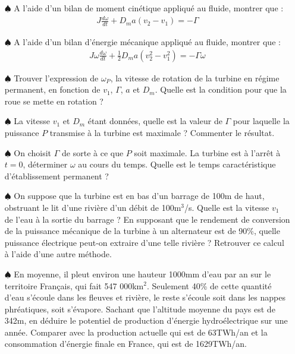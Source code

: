\documentclass{report}
\begin{document}
\begin{itemize}

	\item[$\spadesuit$] A l'aide d'un bilan de moment cinétique appliqué au fluide, montrer que :
	\begin{align*}
		 J\frac{d\omega}{dt}+D_ma(v_2-v_1)=-\Gamma
	\end{align*}

	\item[$\spadesuit$] A l'aide d'un bilan d'énergie mécanique appliqué au fluide, montrer que :	
	\begin{align*}
		J\omega\frac{d\omega}{dt}+\frac{1}{2} D_ma(v_2^2-v_1^2)=-\Gamma\omega
	\end{align*}
	
	\item[$\spadesuit$] Trouver l'expression de $\omega_P$, la vitesse de rotation de la turbine en régime permanent, en fonction de $v_1$, $\Gamma$, $a$ et $D_m$. Quelle est la condition pour que la roue se mette en rotation ?
	
	\item[$\spadesuit$] La vitesse $v_1$ et $D_m$ étant données, quelle est la valeur de $\Gamma$ pour laquelle la puissance $P$ transmise à la turbine est maximale ? Commenter le résultat.
	
	\item[$\spadesuit$] On choisit $\Gamma$ de sorte à ce que $P$ soit maximale. La turbine est à l'arrêt à $t=0$, déterminer $\omega$ au cours du temps. Quelle est le temps caractéristique d'établissement permanent ?
	
	\item[$\spadesuit$] On suppose que la turbine est en bas d'un barrage de 100m de haut, obstruant le lit d'une rivière d'un débit de 100m$^3$/s. Quelle est la vitesse $v_1$ de l'eau à la sortie du barrage ? En supposant que le rendement de conversion de la puissance mécanique de la turbine à un alternateur est de 90\%, quelle puissance électrique peut-on extraire d'une telle rivière ? Retrouver ce calcul à l'aide d'une autre méthode.
	
	\item[$\spadesuit$] En moyenne, il pleut environ une hauteur 1000mm d'eau par an sur le territoire Français, qui fait 547 000km$^2$. Seulement 40\% de cette quantité d'eau s'écoule dans les fleuves et rivière, le reste s'écoule soit dans les nappes phréatiques, soit s'évapore. Sachant que l'altitude moyenne du pays est de 342m, en déduire le potentiel de production d'énergie hydroélectrique sur une année. Comparer avec la production actuelle qui est de 63TWh/an et la consommation d'énergie finale en France, qui est de 1629TWh/an.

\end{itemize}
\end{document}
